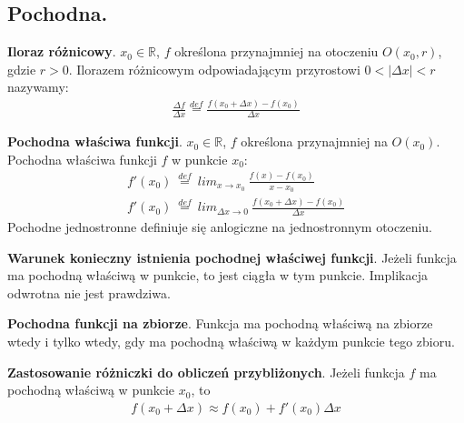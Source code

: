 \documentclass[main.tex]{subfiles}
\begin{document}
    \subsection{Pochodna.}

    \begin{definition}
        \textbf{Iloraz różnicowy}. $x_0 \in \mathbb{R}$, $f$ określona przynajmniej na otoczeniu $O(x_0, r)$,
        gdzie $r > 0$. Ilorazem różnicowym odpowiadającym przyrostowi $0 < |\Delta x| < r$ nazywamy:
        \begin{align*}
            \frac{\Delta f}{\Delta x} \stackrel{def}{=} \frac{f(x_0 + \Delta x) - f(x_0)}{\Delta x}
        \end{align*}
    \end{definition}

    \begin{definition}
        \textbf{Pochodna właściwa funkcji}. $x_0 \in \mathbb{R}$, $f$ określona przynajmniej na $O(x_0)$. Pochodna
        właściwa funkcji $f$ w punkcie $x_0$:
        \begin{gather*}
            f'(x_0) ~ \stackrel{def}{=} ~ lim_{x \rightarrow x_0} ~ \frac{f(x) - f(x_0)}{x - x_0}\\
            f'(x_0) ~ \stackrel{def}{=} ~ lim_{\Delta x \rightarrow 0} ~ \frac{f(x_0 + \Delta x) - f(x_0)}{\Delta x}
        \end{gather*}
        Pochodne jednostronne definiuje się anlogiczne na jednostronnym otoczeniu.
    \end{definition}

    \begin{theorem}
        \textbf{Warunek konieczny istnienia pochodnej właściwej funkcji}. Jeżeli funkcja ma pochodną właściwą w punkcie,
        to jest ciągła w tym punkcie. Implikacja odwrotna nie jest prawdziwa.
    \end{theorem}

    \begin{definition}
        \textbf{Pochodna funkcji na zbiorze}. Funkcja ma pochodną właściwą na zbiorze wtedy i tylko wtedy, gdy ma pochodną
        właściwą w każdym punkcie tego zbioru.
    \end{definition}

    \begin{theorem}
        \textbf{Zastosowanie różniczki do obliczeń przybliżonych}. Jeżeli funkcja $f$ ma pochodną właściwą w punkcie
        $x_0$, to
        \begin{align*}
            f(x_0 + \Delta x) \approx f(x_0) + f'(x_0)\Delta x
        \end{align*}
    \end{theorem}
\end{document}
